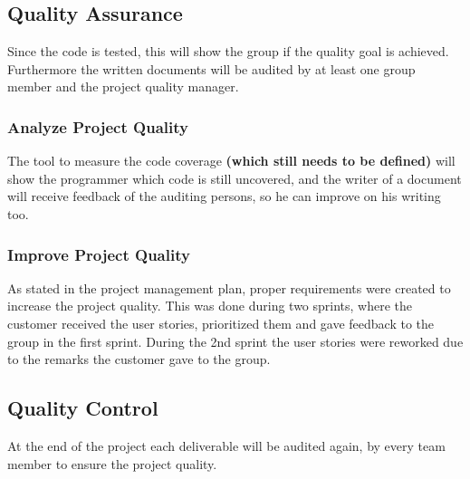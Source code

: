 \subsection{Quality Assurance}
Since the code is tested, this will show the group if the quality goal is achieved. Furthermore the written documents will be audited by at least one group member and the project quality manager.
\subsubsection{Analyze Project Quality}
The tool to measure the code coverage \textbf{(which still needs to be defined)} will show the programmer which code is still uncovered, and the writer of a document will receive feedback of the auditing persons, so he can improve on his writing too.
\subsubsection{Improve Project Quality}
As stated in the project management plan, proper requirements were created to increase the project quality. This was done during two sprints, where the customer received the user stories, prioritized them and gave feedback to the group in the first sprint. During the 2nd sprint the user stories were reworked due to the remarks the customer gave to the group.

\subsection{Quality Control}
At the end of the project each deliverable will be audited again, by every team member to ensure the project quality.
